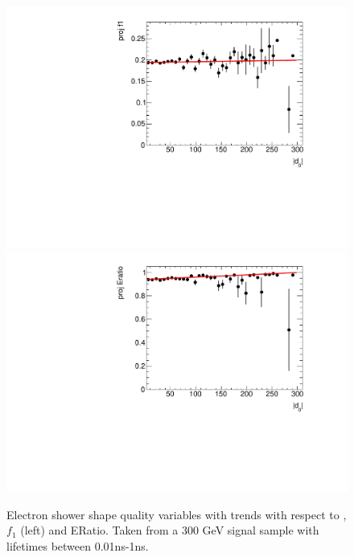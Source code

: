 \begin{figure}[htbp]
\centering
\includegraphics[width=.48\textwidth]{figures/disp_systs/e_signal_f1_profile.pdf}
\includegraphics[width=.48\textwidth]{figures/disp_systs/e_signal_Eratio_profile.pdf}
\caption{Electron shower shape quality variables with trends with respect to \absdz, $f_{1}$ (left) and ERatio. Taken from a 300 GeV signal sample with lifetimes between 0.01ns-1ns.}
\label{fig:profs_el}
\end{figure}


